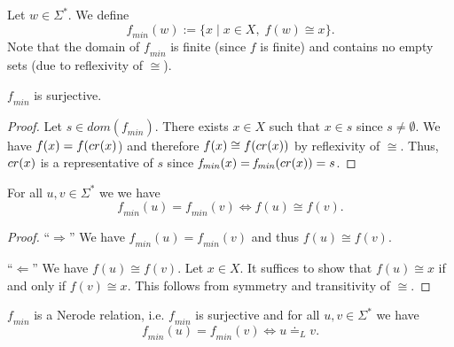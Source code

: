 
\begin{definition}
    \label{f_min}
    Let $w \in \Sigma^*$. We define
    \begin{equation*}
        \mathit{f_{min}}(w) := \{ x \; | \; x \in X, \; f(w) \cong x \}.
    \end{equation*}
    Note that the domain of $\mathit{f_{min}}$ is finite (since $f$ is finite) and contains no empty sets (due to reflexivity of $\cong$).
\end{definition}

\begin{lemma}
    \label{f_min_surjective}
    $\mathit{f_{min}}$ is surjective.
\end{lemma}
\begin{proof}
    Let $s \in dom(\mathit{f_{min}})$. 
    There exists $x \in X$ such that $x \in s$ since $s \neq \emptyset$. 
    We have $f(x) = f(cr(x)$) and therefore $f(x) \cong f(cr(x))$ by reflexivity of $\cong$.
    Thus, $cr(x)$ is a representative of $s$ since $\mathit{f_{min}}(x) = \mathit{f_{min}}(cr(x)) = s$.
\end{proof}

\begin{lemma}
    \label{f_minP}
    For all $u,v \in \Sigma^*$ we we have 
    \begin{equation*}
        \mathit{f_{min}}(u) = \mathit{f_{min}}(v) \iff f(u) \cong f(v).
    \end{equation*}
\end{lemma}

\begin{proof}
    ``$\Rightarrow$''
    We have $\mathit{f_{min}}(u) = \mathit{f_{min}}(v)$ and thus $f(u) \cong f(v)$.

    ``$\Leftarrow$''
    We have $f(u) \cong f(v)$. 
    Let $x \in X$.
    It suffices to show that $f(u) \cong x$ if and only if $f(v) \cong x$.
    This follows from symmetry and transitivity of $\cong$.
\end{proof}

\begin{theorem}
    \label{f_min_correct}
    $\mathit{f_{min}}$ is a Nerode relation, i.e. $\mathit{f_{min}}$ is surjective and for all $u,v \in \Sigma^*$ we have
    \begin{equation*}
        \mathit{f_{min}}(u) = \mathit{f_{min}}(v) \iff u \doteq_L v.
    \end{equation*}
\end{theorem}

